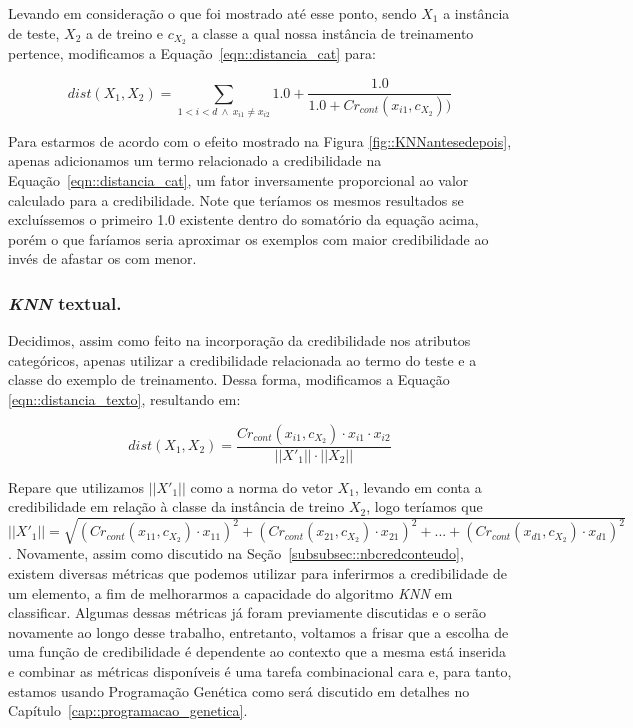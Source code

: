 Levando em consideração o que foi mostrado até esse ponto, sendo $X_1$ a instância de teste, $X_2$ a de treino e $c_{X_2}$ a classe a qual nossa instância de treinamento pertence, modificamos a Equação~\ref{eqn::distancia_cat} para:

\begin{equation} \label{eqn::distancia_cat_cred}
   dist(X_1, X_2) = \sum_{1 < i < d \ \wedge \ x_{i1} \neq x_{i2}} 1.0 + \frac{1.0}{1.0 + Cr_{cont}(x_{i1}, c_{X_2} ))}
\end{equation}

Para estarmos de acordo com o efeito mostrado na Figura \ref{fig::KNNantesedepois}, apenas adicionamos um termo relacionado a credibilidade na Equação~\ref{eqn::distancia_cat}, um fator inversamente proporcional ao valor calculado para a credibilidade. Note que teríamos os mesmos resultados se excluíssemos o primeiro 1.0 existente dentro do somatório da equação acima, porém o que faríamos seria aproximar os exemplos com maior credibilidade ao invés de afastar os com menor.

\subsubsection{\textit{KNN} textual.}
\label{subsubsec::knntexto}

Decidimos, assim como feito na incorporação da credibilidade nos atributos categóricos, apenas utilizar a credibilidade relacionada ao termo do teste e a classe do exemplo de treinamento. Dessa forma, modificamos a Equação \ref{eqn::distancia_texto}, resultando em:

\begin{equation}\label{eqn::distancia_texto_cat}
    dist(X_1, X_2) = \frac{  Cr_{cont}(x_{i1}, c_{X_2}) \cdot x_{i1} \cdot x_{i2} }{ ||X'_1|| \cdot ||X_2|| }
\end{equation}

Repare que utilizamos $||X'_1||$ como a norma do vetor $X_1$, levando em conta a credibilidade em relação à classe da instância de treino $X_2$, logo teríamos que $||X'_1|| = \sqrt{ ( Cr_{cont}(x_{11}, c_{X_2}) \cdot x_{11} )^2 + ( Cr_{cont}(x_{21}, c_{X_2}) \cdot x_{21} )^2 +  ... +  ( Cr_{cont}(x_{d1}, c_{X_2}) \cdot  x_{d1} )^2}$.
Novamente, assim como discutido na Seção~\ref{subsubsec::nbcredconteudo}, existem diversas métricas que podemos utilizar para inferirmos a credibilidade de um elemento, a fim de melhorarmos a capacidade do algoritmo \textit{KNN} em classificar. Algumas dessas métricas já foram previamente discutidas e o serão novamente ao longo desse trabalho, entretanto, voltamos a frisar que a escolha de uma função de credibilidade é dependente ao contexto que a mesma está inserida e combinar as métricas disponíveis é uma tarefa combinacional cara e, para tanto, estamos usando Programação Genética como será discutido em detalhes no Capítulo~\ref{cap::programacao_genetica}.

